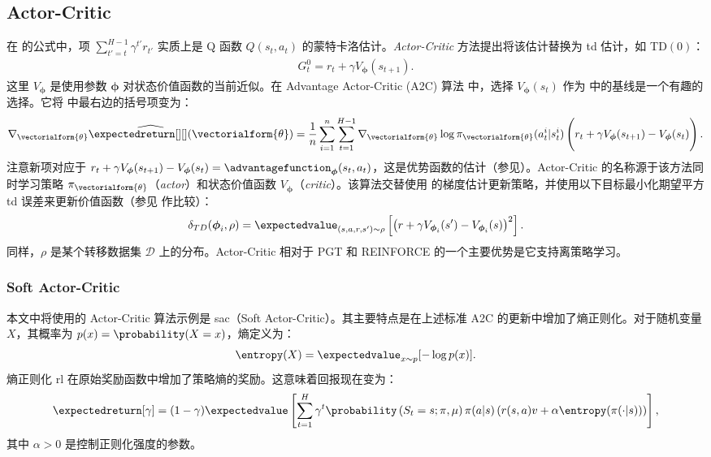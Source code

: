 \subsection{Actor-Critic}
在  的公式中，项 $\textstyle\sum\nolimits_{t'=t}^{H-1}\gamma^{t'} r_{t'}$ 实质上是 Q 函数 $Q(s_t,a_t)$ 的蒙特卡洛估计。\emph{Actor-Critic} 方法提出将该估计替换为 \gls{td} 估计，如 TD$(0)$：
\begin{align*}
    G_{t}^0 = r_{t} + \gamma V_{\boldsymbol\phi}(s_{t+1}).
\end{align*}
这里 $V_{\boldsymbol\phi}$ 是使用参数 $\boldsymbol\phi$ 对状态价值函数的当前近似。在 Advantage Actor-Critic (A2C) 算法 \cite{mnih2016asynchronous} 中，选择 $V_{\boldsymbol\phi}(s_{t})$ 作为  中的基线是一个有趣的选择。它将  中最右边的括号项变为：
\begin{align}
\label{eq:a2c}
    \widehat{\nabla_{\vectorialform{\theta}} \expectedreturn[][](\vectorialform{\theta})} = \frac{1}{n}\sum_{i=1}^{n}\sum_{t=1}^{H-1} \nabla_{\vectorialform{\theta}} \log \pi_{\vectorialform{\theta}}(a_t^i\vert s_t^i)
    \left(\vphantom{\sum_{i=1}^{n}\sum_{t=1}^{H-1}} r_{t} + \gamma V_{\boldsymbol\phi}(s_{t+1}) - V_{\boldsymbol\phi}(s_{t})\right).
\end{align}
注意新项对应于 $r_{t} + \gamma V_{\boldsymbol\phi}(s_{t+1}) - V_{\boldsymbol\phi}(s_{t})=\advantagefunction_{\boldsymbol\phi}(s_t,a_t)$，这是优势函数的估计（参见）。Actor-Critic 的名称源于该方法同时学习策略 $\pi_{\vectorialform{\theta}}$（\emph{actor}）和状态价值函数 $V_{\boldsymbol\phi}$（\emph{critic}）。该算法交替使用  的梯度估计更新策略，并使用以下目标最小化期望平方 \gls{td} 误差来更新价值函数（参见  作比较）：
\begin{align}
\label{eq:update_a2c}
    \delta_{TD}(\boldsymbol\phi_i,\rho) = \expectedvalue_{(s,a,r,s')\sim\rho}\left[\left(r+\gamma V_{\boldsymbol\phi_i}(s') - V_{\boldsymbol\phi_{i}}(s)\right)^2\right].
\end{align}
同样，$\rho$ 是某个转移数据集 $\mathcal D$ 上的分布。Actor-Critic 相对于 PGT 和 REINFORCE 的一个主要优势是它支持离策略学习。

\subsubsection{Soft Actor-Critic}
本文中将使用的 Actor-Critic 算法示例是 \gls{sac}（Soft Actor-Critic）\cite{haarnoja2018soft}。其主要特点是在上述标准 A2C 的更新中增加了熵正则化。对于随机变量 $X$，其概率为 $p(x)=\probability(X=x)$，熵定义为：
\begin{align*}
    \entropy(X) = \expectedvalue_{x\sim p}[-\log p(x)].
\end{align*}
熵正则化 \gls{rl} 在原始奖励函数中增加了策略熵的奖励。这意味着回报现在变为：
\begin{align}
\label{eq:discounted_reward_entropy}
    \expectedreturn[\gamma] = (1-\gamma)\expectedvalue\left[\sum_{t=1}^H \gamma^t  \probability\left(S_t=s; \pi,\mu\right)\pi(a\vert s) \left(r(s,a)v + \alpha \entropy(\pi(\cdot\vert s))\right)\right],
\end{align}
其中 $\alpha>0$ 是控制正则化强度的参数。

